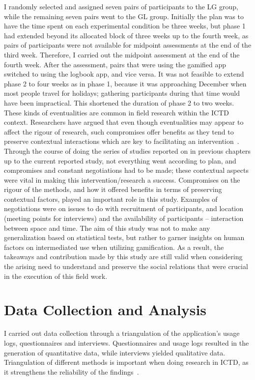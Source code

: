 I randomly selected and assigned seven pairs of participants to the LG group, while the remaining seven pairs went to the GL group. Initially the plan was to have the time spent on each experimental condition be three weeks, but phase 1 had extended beyond its allocated block of three weeks up to the fourth week, as pairs of participants were not available for midpoint assessments at the end of the third week. Therefore, I carried out the midpoint assessment at the end of the fourth week. After the assessment, pairs that were using the gamified app switched to using the logbook app, and vice versa. It was not feasible to extend phase 2 to four weeks as in phase 1, because it was approaching December when most people travel for holidays; gathering participants during that time would have been impractical. This shortened the duration of phase 2 to two weeks. These kinds of eventualities are common in field research within the ICTD context. Researchers have argued that even though eventualities may appear to affect the rigour of research, such compromises offer benefits as they tend to preserve contextual interactions which are key to facilitating an intervention~\citep{anokwa2009stories,ramachandran2010research}. Through the course of doing the series of studies reported on in previous chapters up to the current reported study, not everything went according to plan, and compromises and constant negotiations had to be made; these contextual aspects were vital in making this intervention/research a success. Compromises on the rigour of the methods, and how it offered benefits in terms of preserving contextual factors, played an important role in this study. Examples of negotiations were on issues to do with recruitment of participants, and location (meeting points for interviews) and the availability of participants -- interaction between space and time. The aim of this study was not to make any generalization based on statistical tests, but rather to garner insights on human factors on intermediated use when utilizing gamification.  As a result, the takeaways and contribution made by this study are still valid when considering the arising need to understand and preserve the social relations that were crucial in the execution of this field work.
\section{Data Collection and Analysis}\label{datacollect}
I carried out data collection through a triangulation of the application's usage logs, questionnaires and interviews. Questionnaires and usage logs resulted in the generation of quantitative data, while interviews yielded qualitative data. Triangulation of different methods is important when doing research in ICTD, as it strengthens the reliability of the findings~\citep{burrell2009constitutes}.


